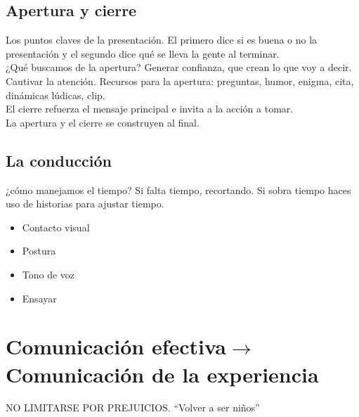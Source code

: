 \documentclass[12pt]{article} %
\begin{document}
\subsection{Apertura y cierre}
Los puntos claves de la presentación. El primero dice si es buena o no la presentación y el segundo dice qué se lleva la gente al terminar.\\
¿Qué buscamos de la apertura? Generar confianza, que crean lo que voy a decir. Cautivar la atención. Recursos para la apertura: preguntas, humor, enigma, cita, dinámicas lúdicas, clip.\\
El cierre refuerza el mensaje principal e invita a la acción a tomar.\\
La apertura y el cierre se construyen al final.
\subsection{La conducción}
¿cómo manejamos el tiempo? Si falta tiempo, recortando. Si sobra tiempo haces uso de historias para ajustar tiempo.
\begin{itemize}
\item Contacto visual
\item Postura
\item Tono de voz
\item Ensayar
\end{itemize}
\section{Comunicación efectiva$\rightarrow$ Comunicación de la experiencia}
NO LIMITARSE POR PREJUICIOS. ``Volver a ser niños''\\
\end{document}
